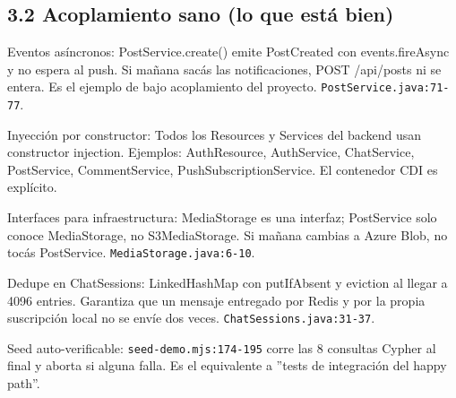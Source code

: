 \documentclass[10pt,a4paper]{article}
\newcommand{\code}[1]{\nolinkurl{#1}}
\begin{document}
\subsection{3.2 Acoplamiento sano (lo que está bien)}
Eventos asíncronos: PostService.create() emite PostCreated con events.fireAsync y no espera al push. Si mañana sacás las notificaciones, POST /api/posts ni se entera. Es el ejemplo de bajo acoplamiento del proyecto. \code{PostService.java:71-77}.\par\vspace{0.4em}
Inyección por constructor: Todos los Resources y Services del backend usan constructor injection. Ejemplos: AuthResource, AuthService, ChatService, PostService, CommentService, PushSubscriptionService. El contenedor CDI es explícito.\par\vspace{0.4em}
Interfaces para infraestructura: MediaStorage es una interfaz; PostService solo conoce MediaStorage, no S3MediaStorage. Si mañana cambias a Azure Blob, no tocás PostService. \code{MediaStorage.java:6-10}.\par\vspace{0.4em}
Dedupe en ChatSessions: LinkedHashMap con putIfAbsent y eviction al llegar a 4096 entries. Garantiza que un mensaje entregado por Redis y por la propia suscripción local no se envíe dos veces. \code{ChatSessions.java:31-37}.\par\vspace{0.4em}
Seed auto-verificable: \code{seed-demo.mjs:174-195} corre las 8 consultas Cypher al final y aborta si alguna falla. Es el equivalente a ''tests de integración del happy path''.\par\vspace{0.4em}
\end{document}
